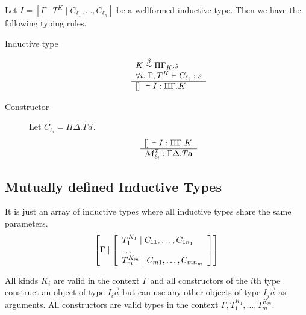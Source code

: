 Let $I = [\Gamma \mid T^K \mid C_{\ell_1}, \ldots, C_{\ell_n}]$ be a wellformed
inductive type. Then we have the following typing rules.

\begin{description}

    \item [Inductive type]
        $$
            \rulev{
                K \; \betaeq\; \Pi \Gamma_K. s
                \\
                \forall i.\; \Gamma, T^K \vdash C_{\ell_i}: s
            }
            {
                [] \vdash I : \Pi \Gamma. K
            }
        $$


    \item [Constructor] Let $C_{\ell_i} = \Pi \Delta. T \vec a$.
        $$
        \begin{array}{l} 
            [] \vdash I: \Pi \Gamma. K
         \\ \hline 
            {\cal M}^{\cal I}_{\ell_i}: \Gamma \Delta.T {\mathbf a}
         \end{array}
        $$
\end{description}






\subsection{Mutually defined Inductive Types}

It is just an array of inductive types where all inductive types share the same
parameters.
$$
    \left[\Gamma \mid
    \left[ \begin{array}{lllll} 
        T_1^{K_1} \mid C_{11}, \ldots, C_{1n_1}
        \\
        \ldots
        \\
        T_m^{K_m} \mid C_{m1}, \ldots, C_{mn_m}
     \end{array} \right]
    \right]
$$

All kinds $K_i$ are valid in the context $\Gamma$ and all constructors of the
$i$th type construct an object of type $I_i \vec a$ but can use any other
objects of type $I_j \vec a$ as arguments. All constructors are valid types in
the context $\Gamma, T_1^{K_1}, \ldots , T_m^{K_m}$.
